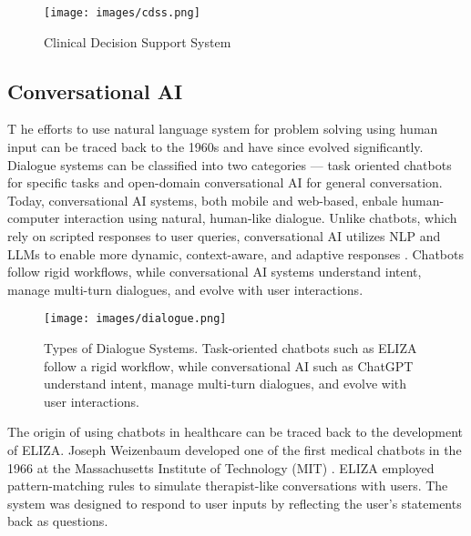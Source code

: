 \begin{figure}[H]
    \centering
    \texttt{[image: images/cdss.png]}
    \caption{Clinical Decision Support System}
    \label{fig:cdss}
\end{figure}

\subsection{Conversational AI}
\lettrine{T}{ }he efforts to use natural language system for problem solving using human input can be traced back to the 1960s \cite{bobrow1964natural} and have since evolved significantly. Dialogue systems can be classified into two categories --- task oriented chatbots for specific tasks and open-domain conversational AI for general conversation. Today, conversational AI systems, both mobile and web-based, enbale human-computer interaction using natural, human-like dialogue. Unlike chatbots, which rely on scripted responses to user queries, conversational AI utilizes NLP and LLMs to enable more dynamic, context-aware, and adaptive responses \cite{jurafsky2000speech}. Chatbots follow rigid workflows, while conversational AI systems understand intent, manage multi-turn dialogues, and evolve with user interactions.
\begin{figure}[H]
    \centering
    \texttt{[image: images/dialogue.png]}
    \caption{Types of Dialogue Systems. Task-oriented chatbots such as ELIZA follow a rigid workflow, while conversational AI such as ChatGPT understand intent, manage multi-turn dialogues, and evolve with user interactions.}
    \label{fig:dialogue}
\end{figure}

\noindent The origin of using chatbots in healthcare can be traced back to the development of ELIZA. Joseph Weizenbaum developed one of the first medical chatbots in the 1966 at the Massachusetts Institute of Technology (MIT) \cite{haug2023artificial, weizenbaum1966eliza}. ELIZA employed pattern-matching rules to simulate therapist-like conversations with users. The system was designed to respond to user inputs by reflecting the user's statements back as questions. \\[\baselineskip]

